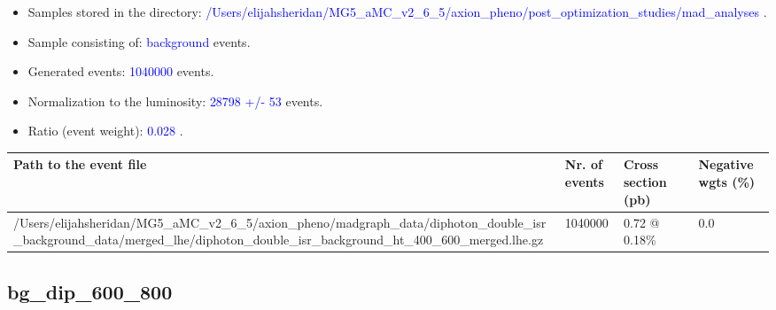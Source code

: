 \documentclass[a4paper, 10pt]{article}
\begin{document}
\begin{itemize}
  \item Samples stored in the directory: \textcolor{blue}{/\-Users/\-elijahsheridan/\-MG5\_aMC\_v2\_6\_5/\-axion\_pheno/\-post\_optimization\_studies/\-mad\_analyses} .
   \item Sample consisting of: \textcolor{blue}{background}  events.
   \item Generated events: \textcolor{blue}{1040000 }  events.
   \item Normalization to the luminosity: \textcolor{blue}{28798}\textcolor{blue}{ +/\-- }\textcolor{blue}{53 }  events.
   \item Ratio (event weight): \textcolor{blue}{0.028 } .  
 
\end{itemize}
\begin{table}[H]
  \begin{center}
    \begin{tabular}{|m{55.0mm}|m{25.0mm}|m{30.0mm}|m{30.0mm}|}
      \hline
      {\cellcolor{yellow}         Path to the event file}& {\cellcolor{yellow}         Nr. of events}& {\cellcolor{yellow}         Cross section (pb)}& {\cellcolor{yellow}         Negative wgts (\%)}\\
      \hline
      {\cellcolor{white}          /\-Users/\-elijahsheridan/\-MG5\_aMC\_v2\_6\_5/\-axion\_pheno/\-madgraph\_data/\-diphoton\_double\_isr\_background\_data/\-merged\_lhe/\-diphoton\_double\_isr\_background\_ht\_400\_600\_merged.lhe.gz}& {\cellcolor{white}          1040000}& {\cellcolor{white}          0.72 @ 0.18\%}& {\cellcolor{white}          0.0}\\
\hline
    \end{tabular}
  \end{center}
\end{table}

\subsection{ bg\_dip\_600\_800}
\end{document}
